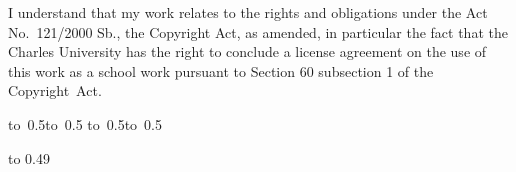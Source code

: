 \medskip
\noindent
I understand that my work relates to the rights and obligations under the Act No.~121/2000 Sb.,
the Copyright Act, as amended, in particular the fact that the Charles University has the right
to conclude a license agreement on the use of this work as a school work pursuant to Section 60
subsection 1 of the Copyright~Act.

\vspace{10mm}
\hbox{\hbox to 0.5\hbox to 0.5\hsize{\dotfill\quad}}
\smallskip
\hbox{\hbox to 0.5\hsize{}\hbox to 0.5}
\vspace{20mm}


\newpage
\openright
\noindent
\Dedication


\newpage
\openright
\vbox to 0.49


\newpage
\openright
\pagestyle{plain}
\setcounter{page}{1}

